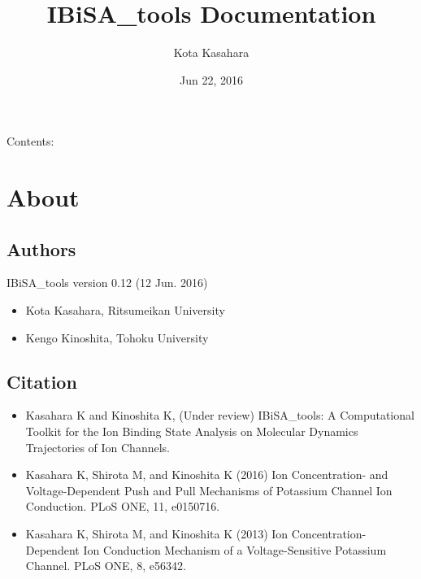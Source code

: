 \documentclass[letterpaper,10pt,english]{sphinxmanual}
\title{IBiSA\_tools Documentation}
\date{Jun 22, 2016}
\author{Kota Kasahara}
\begin{document}
\maketitle
\tableofcontents
{}\label{index::doc}


Contents:


\chapter{About}
\label{about:about}\label{about::doc}\label{about:welcome-to-ibisa-tools-s-documentation}

\section{Authors}
\label{about:authors}
IBiSA\_tools version 0.12 (12 Jun. 2016)
\begin{itemize}
\item {} 
Kota Kasahara, Ritsumeikan University

\item {} 
Kengo Kinoshita, Tohoku University

\end{itemize}


\section{Citation}
\label{about:citation}\begin{itemize}
\item {} 
Kasahara K and Kinoshita K, (Under review) IBiSA\_tools: A Computational Toolkit for the Ion Binding State Analysis on Molecular Dynamics Trajectories of Ion Channels.

\item {} 
Kasahara K, Shirota M, and Kinoshita K (2016) Ion Concentration- and Voltage-Dependent Push and Pull Mechanisms of Potassium Channel Ion Conduction. PLoS ONE, 11, e0150716.

\item {} 
Kasahara K, Shirota M, and Kinoshita K (2013) Ion Concentration-Dependent Ion Conduction Mechanism of a Voltage-Sensitive Potassium Channel. PLoS ONE, 8, e56342.

\end{itemize}
\end{document}
